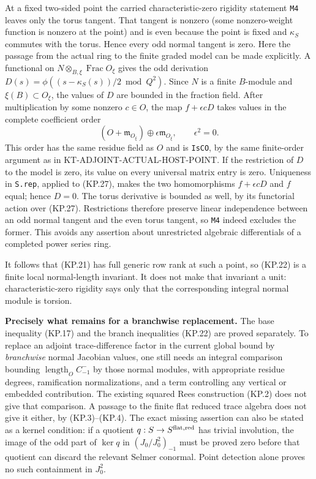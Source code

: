 \documentclass[11pt,a4paper]{article}
\theoremstyle{definition}
\renewcommand{\paragraph}[1]{\par\smallskip\noindent\textbf{#1}\quad\ignorespaces}
\begin{document}
At a fixed two-sided point the carried characteristic-zero
rigidity statement \texttt{M4} leaves only the torus tangent.
That tangent is nonzero (some nonzero-weight function is
nonzero at the point) and is even because the point is fixed
and $\kappa_S$ commutes with the torus.  Hence every odd
normal tangent is zero.  Here the passage from the actual
ring to the finite graded model can be made explicitly.
A functional on $N\otimes_{B,\xi}\operatorname{Frac}O_\xi$
gives the odd derivation
$D(s)=\phi((s-\kappa_S(s))/2\bmod Q^2)$.
Since $N$ is a finite $B$-module and $\xi(B)\subset O_\xi$,
the values of $D$ are bounded in the fraction field.
After multiplication by some nonzero $c\in O$, the map
$f+\epsilon cD$ takes values in the complete coefficient
order
\[
 (O+\mathfrak m_{O_\xi})\oplus
                  \epsilon\mathfrak m_{O_\xi},\qquad\epsilon^2=0.
                                                                  \tag{KP.27}
\]
This order has the same residue field as $O$ and is
\texttt{IsCO}, by the same finite-order argument as in
KT-ADJOINT-ACTUAL-HOST-POINT.  If the restriction of $D$
to the model is zero, its value on every universal matrix
entry is zero.  Uniqueness in \texttt{S.rep}, applied to
(KP.27), makes the two homomorphisms $f+\epsilon cD$ and
$f$ equal; hence $D=0$.  The torus derivative is bounded
as well, by its functorial action over (KP.27).  Restrictions
therefore preserve linear independence between an odd
normal tangent and the even torus tangent, so \texttt{M4}
indeed excludes the former.  This avoids any assertion
about unrestricted algebraic differentials of a completed
power series ring.

It follows that (KP.21) has full generic row rank at such
a point, so (KP.22) is a finite local normal-length
invariant.  It does not make that invariant a unit:
characteristic-zero rigidity says only that the
corresponding integral normal module is torsion.

\paragraph{Precisely what remains for a branchwise replacement.}
The base inequality (KP.17) and the branch inequalities
(KP.22) are proved separately.  To replace an adjoint
trace-difference factor in the current global bound by
\emph{branchwise} normal Jacobian values, one still needs
an integral comparison bounding
$\operatorname{length}_O C^-_{-1}$ by those normal modules,
with appropriate residue degrees, ramification normalizations,
and a term controlling any vertical or embedded contribution.
The existing squared Rees construction (KP.2) does not give
that comparison.  A passage to the finite flat reduced
trace algebra does not give it either, by (KP.3)--(KP.4).
The exact missing assertion can also be stated as a kernel
condition: if a quotient $q:S\to S^{\rm flat,red}$ has trivial
involution, the image of the odd part of $\ker q$ in
$(J_0/J_0^2)_{-1}$ must be proved zero before that quotient
can discard the relevant Selmer conormal.  Point detection
alone proves no such containment in $J_0^2$.
\end{document}

